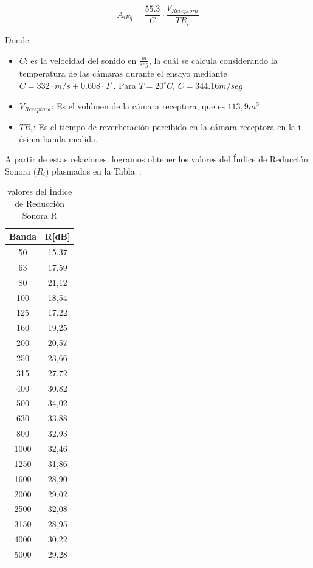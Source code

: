 \begin{equation}
    A_{i Eq} =  \frac{55.3}{C} \cdot \frac{V_{Receptora}}{TR_i}
    \label{eq:aerea_equivalente}
\end{equation}

\par Donde:
\begin{itemize}
    \item $C$: es la velocidad del sonido en $\frac{m}{seg}$, la cuál se calcula considerando la temperatura de las cámaras durante el ensayo mediante $C = 332\cdot m/s+ 0.608 \cdot T^{\circ}$. Para $T= 20^{\circ}C$, $C = 344.16 m/seg$
    \item $V_{Receptora}$: Es el volúmen de la cámara receptora, que es $113,9m^3$
    \item $TR_i$: Es el tiempo de reverberación percibido en la cámara receptora en la i-ésima banda medida.
\end{itemize}

\par A partir de estas relaciones, logramos obtener los valores del Índice de Reducción Sonora ($R_i$) plasmados en la Tabla~:

\begin{table}[H]
\setlength\arrayrulewidth{1pt}
    \centering
    \begin{tabular}{|c|c|} \hline
        \textbf{Banda} & \textbf{R[dB]} \\\hline
        50 & 15,37\\\hline
        63 & 17,59\\\hline
        80 & 21,12 \\\hline
        100 & 18,54\\\hline
        125 & 17,22\\\hline
        160 & 19,25\\\hline
        200 & 20,57\\\hline
        250 & 23,66\\\hline
        315 & 27,72\\\hline
        400 & 30,82\\\hline
        500 & 34,02\\\hline
        630 & 33,88\\\hline
        800 & 32,93\\\hline
        1000& 32,46\\\hline
        1250& 31,86\\\hline
        1600& 28,90\\\hline
        2000& 29,02\\\hline
        2500& 32,08\\\hline
        3150& 28,95\\\hline
        4000& 30,22\\\hline
        5000& 29,28\\\hline
    \end{tabular}
    \caption{valores del Índice de Reducción Sonora R}
    \label{tab:reduccion_sonora_R}
\end{table}

